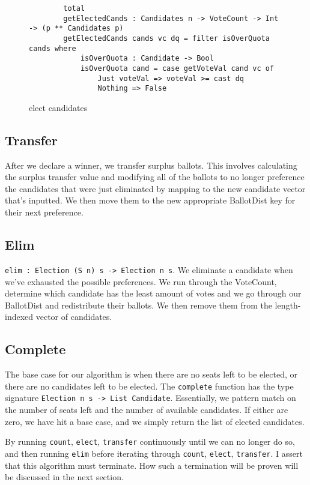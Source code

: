 \begin{figure}[ht!!!!!!!]
    \caption{elect candidates}
    \label{electcands}
    \begin{lstlisting}
        total
        getElectedCands : Candidates n -> VoteCount -> Int -> (p ** Candidates p)
        getElectedCands cands vc dq = filter isOverQuota cands where
            isOverQuota : Candidate -> Bool
            isOverQuota cand = case getVoteVal cand vc of 
                Just voteVal => voteVal >= cast dq
                Nothing => False
    \end{lstlisting}
\end{figure}

\subsection{Transfer}
After we declare a winner, we transfer surplus ballots. This involves
calculating the surplus transfer value and modifying all of the ballots to no
longer preference the candidates that were just eliminated by mapping to the new
candidate vector that's inputted. We then move them to the new appropriate
BallotDist key for their next preference. 

\subsection{Elim}
\texttt{elim : Election (S n) s -> Election n s}. We eliminate a candidate when
we've exhausted the possible preferences. We run through the VoteCount,
determine which candidate has the least amount of votes and we go through our
BallotDist and redistribute their ballots. We then remove them from the
length-indexed vector of candidates. 

\subsection{Complete}
The base case for our algorithm is when there are no seats left to be elected,
or there are no candidates left to be elected. The \texttt{complete} function
has the type signature \texttt{Election n s -> List Candidate}. Essentially, we
pattern match on the number of seats left and the number of available
candidates. If either are zero, we have hit a base case, and we simply return
the list of elected candidates. 

By running \texttt{count}, \texttt{elect}, \texttt{transfer} continuously until
we can no longer do so, and then running \texttt{elim} before iterating through
\texttt{count}, \texttt{elect}, \texttt{transfer}. I assert that this algorithm
must terminate. How such a termination will be proven will be discussed in the
next section.

